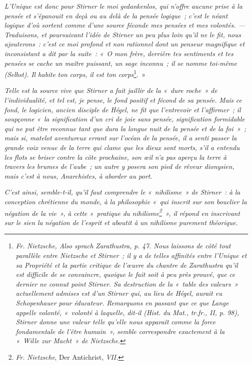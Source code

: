 \documentclass[french,twoside]{book} %
\begin{document}
\emph{L’Unique est donc pour Stirner le moi \emph{gedankenlos}, qui n’offre aucune prise à la pensée et s’épanouit en deçà ou au delà de la pensée logique ; c’est le néant logique d’où sortent comme d’une source féconde mes pensées et mes volontés. — Traduisons, et poursuivant l’idée de Stirner un peu plus loin qu’il ne le fit, nous ajouterons : c’est ce moi profond et non rationnel dont un penseur magnifique et inconsistant a dit par la suite : « O mon frère, derrière tes sentiments et tes pensées se cache un maître puissant, un sage inconnu ; il se nomme toi-même (Selbst). Il habite ton corps, il est ton corps}\footnote{ \noindent \emph{Fr. Nietzsche, \emph{Also sprach Zarathustra}, p. 47. Nous laissons de côté tout parallèle entre Nietzsche et Stirner ; il y a de telles affinités entre l'\emph{Unique et sa Propriété} et la partie critique de l'œuvre du chantre de Zarathustra qu'il est difficile de se convaincre, quoique le fait soit à peu près prouvé, que ce dernier ne connut point Stirner. Sa destruction de la « table des valeurs » actuellement admises est d’un Stirner qui, au lieu de Hégel, aurait eu Schopenhauer pour éducateur. Remarquons en passant que ce que Lange appelle volonté, « volonté à laquelle, dit-il (\emph{Hist. du Mat.}, tr.fr., II, p. 98), Stirner donne une valeur telle qu’elle nous apparaît comme la force fondamentale de l’être humain », semble correspondre exactement à la « Wille zur Macht » de Nietzsche.}
 }. »\par
 \emph{Telle est la source vive que Stirner a fait jaillir de la « dure roche » de l’individualité, et tel est, je pense, le fond positif et fécond de sa pensée. Mais ce fond, le logicien, ancien disciple de Hégel, ne fit que l’entrevoir et l’affirmer ; il soupçonne « la signification d’un cri de joie sans pensée, signification formidable qui ne put être reconnue tant que dura la longue nuit de la pensée et de la foi » ; mais si, matelot aventureux errant sur l’océan de la pensée, il a senti passer la grande voix venue de la terre qui clame que les dieux sont morts, s’il a entendu les flots se briser contre la côte prochaine, son œil n’a pas aperçu la terre à travers les brumes de l’aube ; un autre y posera son pied de rêveur dionysien, mais c’est à nous, Anarchistes, à aborder au port.}\par
\emph{C’est ainsi, semble-t-il, qu’il faut comprendre le « nihilisme » de Stirner : à la conception chrétienne du monde, à la philosophie « qui inscrit sur son bouclier la négation de la vie », à cette « pratique du nihilisme\footnote{ \noindent \emph{Fr. Nietzsche}, Der Antichrist, \emph{VII.}
 } », il répond en inscrivant sur le sien la négation de l’esprit et aboutit à un nihilisme purement théorique.}\par
\end{document}
